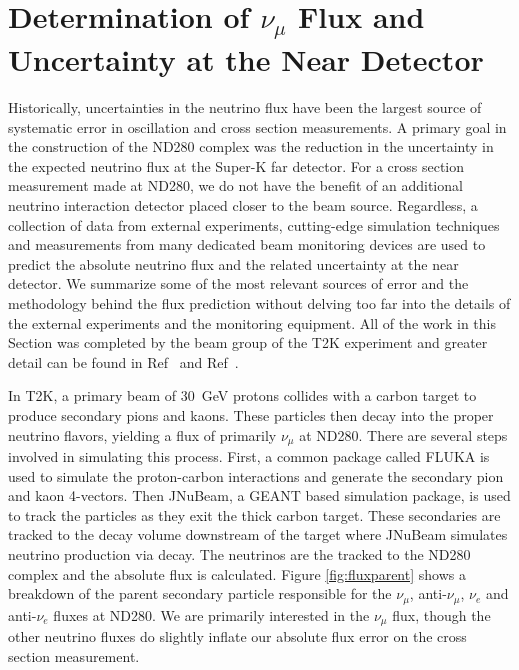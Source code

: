 \section{Determination of $\nu_\mu$ Flux and Uncertainty at the Near Detector}
\label{sec:FluxDetermination}

Historically, uncertainties in the neutrino flux have been the largest source of systematic error in oscillation and cross section measurements. A primary goal in the construction of the ND280 complex was the reduction in the uncertainty in the expected neutrino flux at the Super-K far detector. For a cross section measurement made at ND280, we do not have the benefit of an additional neutrino interaction detector placed closer to the beam source. Regardless, a collection of data from external experiments, cutting-edge simulation techniques and measurements from many dedicated beam monitoring devices are used to predict the absolute neutrino flux and the related uncertainty at the near detector. We summarize some of the most relevant sources of error and the methodology behind the flux prediction without delving too far into the details of the external experiments and the monitoring equipment. All of the work in this Section was completed by the beam group of the T2K experiment and greater detail can be found in Ref~\cite{fluxpred} and Ref~\cite{fluxtn}.

In T2K, a primary beam of 30~GeV protons collides with a carbon target to produce secondary pions and kaons. These particles then decay into the proper neutrino flavors, yielding a flux of primarily $\nu_\mu$ at ND280. There are several steps involved in simulating this process. First, a common package called FLUKA is used to simulate the proton-carbon interactions and generate the secondary pion and kaon 4-vectors. Then JNuBeam, a GEANT based simulation package, is used to track the particles as they exit the thick carbon target. These secondaries are tracked to the decay volume downstream of the target where JNuBeam simulates neutrino production via decay. The neutrinos are the tracked to the ND280 complex and the absolute flux is calculated. Figure \ref{fig:fluxparent} shows a breakdown of the parent secondary particle responsible for the  $\nu_\mu$, anti-$\nu_\mu$, $\nu_e$ and anti-$\nu_e$ fluxes at ND280. We are primarily interested in the $\nu_\mu$ flux, though the other neutrino fluxes do slightly inflate our absolute flux error on the cross section measurement.

